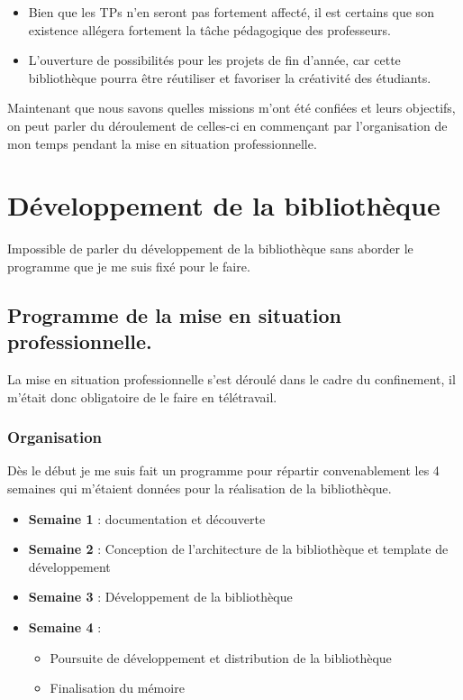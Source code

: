\documentclass[11pt,a4paper,krantz2,11pt,oneside]{krantz}
\providecommand{\tightlist}{%
  \setlength{\itemsep}{0pt}\setlength{\parskip}{0pt}}
\begin{document}
\begin{itemize}
\item
  Bien que les TPs n'en seront pas fortement affecté, il est certains que son existence allégera fortement la tâche pédagogique des professeurs.
\item
  L'ouverture de possibilités pour les projets de fin d'année, car cette bibliothèque pourra être réutiliser et favoriser la créativité des étudiants.
\end{itemize}

Maintenant que nous savons quelles missions m'ont été confiées et leurs objectifs, on peut parler du déroulement de celles-ci en commençant par l'organisation de mon temps pendant la mise en situation professionnelle.

\hypertarget{dev}{%
\chapter{Développement de la bibliothèque}\label{dev}}

Impossible de parler du développement de la bibliothèque sans aborder le programme que je me suis fixé pour le faire.

\hypertarget{programme-de-la-mise-en-situation-professionnelle.}{%
\section{Programme de la mise en situation professionnelle.}\label{programme-de-la-mise-en-situation-professionnelle.}}

La mise en situation professionnelle s'est déroulé dans le cadre du confinement, il m'était donc obligatoire de le faire en télétravail.

\hypertarget{organisation}{%
\subsection{Organisation}\label{organisation}}

Dès le début je me suis fait un programme pour répartir convenablement les 4 semaines qui m'étaient données pour la réalisation de la bibliothèque.

\begin{itemize}
\tightlist
\item
  \textbf{Semaine 1} : documentation et découverte
\item
  \textbf{Semaine 2} : Conception de l'architecture de la bibliothèque et template de développement
\item
  \textbf{Semaine 3} : Développement de la bibliothèque
\item
  \textbf{Semaine 4} :

  \begin{itemize}
  \tightlist
  \item
    Poursuite de développement et distribution de la bibliothèque
  \item
    Finalisation du mémoire
  \end{itemize}
\end{itemize}
\end{document}
